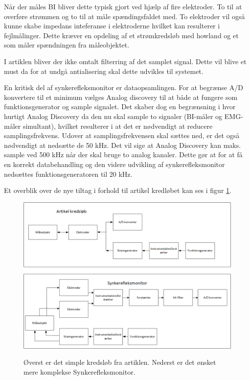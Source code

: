 Når der måles BI bliver dette typisk gjort ved hjælp af fire elektroder\cite{Brantlov2017}. To til at overføre strømmen og to til at måle spændingsfaldet med. To elektroder vil også kunne skabe impedans inteferanse i elektroderne hvilket kan resulterer i fejlmålinger. Dette kræver en opdeling af et strømkredsløb med howland og et som måler spændningen fra måleobjektet.

I artiklen bliver der ikke omtalt filterring af det samplet signal. Dette vil blive et must da for at undgå antialisering\cite{Thomas2011} skal dette udvikles til systemet.


En kritisk del af synkerefleksmonitor er dataopsamlingen. For at begrænse A/D konvertere til et minimum vælges Analog discovery til at både at fungere som funktionsgenerator og sample signalet. Det skaber dog en begrænsning i hvor hurtigt Analog Discovery da den nu skal sample to signaler (BI-måler og EMG-måler simultant), hvilket resulterer i at det er nødvendigt at reducere samplingsfrekvens. Udover at samplingsfrekvensen skal sættes ned, er det også nødvendigt at nedsætte de 50 kHz. Det vil sige at Analog Discovery kan maks. sample ved 500 kHz når der skal bruge to analog kanaler. Dette gør at for at få en korrekt databehandling og den videre udvikling af synkerefleksmonitor nedsættes funktionsgeneratoren til 20 kHz.

Et overblik over de nye tiltag i forhold til artikel kredløbet kan ses i figur \ref{fig:konklusiondiagram}. 



\begin{figure}[H]
\centering
{\includegraphics[width=\linewidth]
{Figure/konklusiondiagram}}
\caption{Øverst er det simple kredsløb fra artiklen. Nederst er det ønsket mere komplekse Synkerefleksmonitor.}
\label{fig:konklusiondiagram}
\end{figure}





